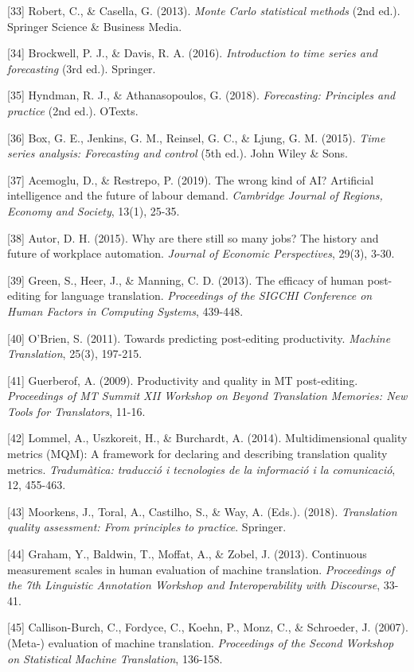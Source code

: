 \documentclass[12pt,a4paper]{article}
\begin{document}
{{{{{{[}33{]} Robert, C., \& Casella, G. (2013). \emph{Monte Carlo
statistical methods} (2nd ed.). Springer Science \& Business Media.

{[}34{]} Brockwell, P. J., \& Davis, R. A. (2016). \emph{Introduction to
time series and forecasting} (3rd ed.). Springer.

{[}35{]} Hyndman, R. J., \& Athanasopoulos, G. (2018).
\emph{Forecasting: Principles and practice} (2nd ed.). OTexts.

{[}36{]} Box, G. E., Jenkins, G. M., Reinsel, G. C., \& Ljung, G. M.
(2015). \emph{Time series analysis: Forecasting and control} (5th ed.).
John Wiley \& Sons.

{[}37{]} Acemoglu, D., \& Restrepo, P. (2019). The wrong kind of AI?
Artificial intelligence and the future of labour demand. \emph{Cambridge
Journal of Regions, Economy and Society}, 13(1), 25-35.

{[}38{]} Autor, D. H. (2015). Why are there still so many jobs? The
history and future of workplace automation. \emph{Journal of Economic
Perspectives}, 29(3), 3-30.

{[}39{]} Green, S., Heer, J., \& Manning, C. D. (2013). The efficacy of
human post-editing for language translation. \emph{Proceedings of the
SIGCHI Conference on Human Factors in Computing Systems}, 439-448.

{[}40{]} O'Brien, S. (2011). Towards predicting post-editing
productivity. \emph{Machine Translation}, 25(3), 197-215.

{[}41{]} Guerberof, A. (2009). Productivity and quality in MT
post-editing. \emph{Proceedings of MT Summit XII Workshop on Beyond
Translation Memories: New Tools for Translators}, 11-16.

{[}42{]} Lommel, A., Uszkoreit, H., \& Burchardt, A. (2014).
Multidimensional quality metrics (MQM): A framework for declaring and
describing translation quality metrics. \emph{Tradumàtica: traducció i
tecnologies de la informació i la comunicació}, 12, 455-463.

{[}43{]} Moorkens, J., Toral, A., Castilho, S., \& Way, A. (Eds.).
(2018). \emph{Translation quality assessment: From principles to
practice}. Springer.

{[}44{]} Graham, Y., Baldwin, T., Moffat, A., \& Zobel, J. (2013).
Continuous measurement scales in human evaluation of machine
translation. \emph{Proceedings of the 7th Linguistic Annotation Workshop
and Interoperability with Discourse}, 33-41.

{[}45{]} Callison-Burch, C., Fordyce, C., Koehn, P., Monz, C., \&
Schroeder, J. (2007). (Meta-) evaluation of machine translation.
\emph{Proceedings of the Second Workshop on Statistical Machine
Translation}, 136-158.

}}}}}
\end{document}
